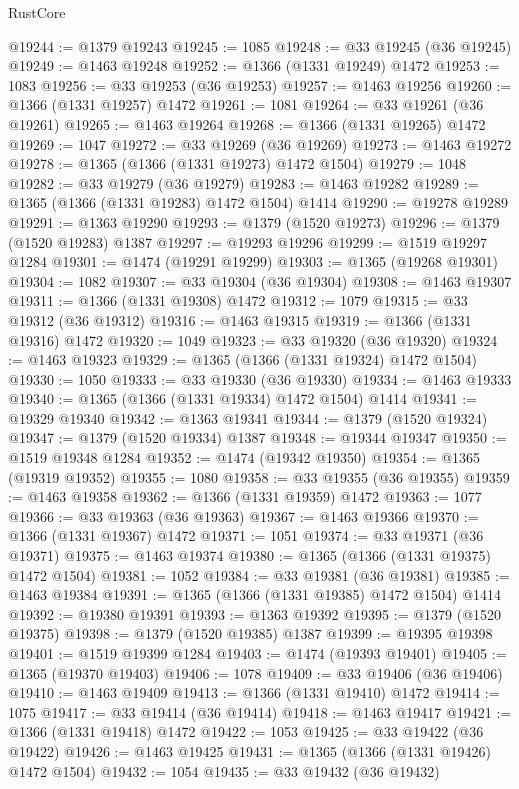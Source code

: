 \begin{lexlean}{RustCore}
\begin{coremodule}
@19244 := @1379 @19243
@19245 := 1085
@19248 := @33 @19245 (@36 @19245)
@19249 := @1463 @19248
@19252 := @1366 (@1331 @19249) @1472
@19253 := 1083
@19256 := @33 @19253 (@36 @19253)
@19257 := @1463 @19256
@19260 := @1366 (@1331 @19257) @1472
@19261 := 1081
@19264 := @33 @19261 (@36 @19261)
@19265 := @1463 @19264
@19268 := @1366 (@1331 @19265) @1472
@19269 := 1047
@19272 := @33 @19269 (@36 @19269)
@19273 := @1463 @19272
@19278 := @1365 (@1366 (@1331 @19273) @1472 @1504)
@19279 := 1048
@19282 := @33 @19279 (@36 @19279)
@19283 := @1463 @19282
@19289 := @1365 (@1366 (@1331 @19283) @1472 @1504) @1414
@19290 := @19278 @19289
@19291 := @1363 @19290
@19293 := @1379 (@1520 @19273)
@19296 := @1379 (@1520 @19283) @1387
@19297 := @19293 @19296
@19299 := @1519 @19297 @1284
@19301 := @1474 (@19291 @19299)
@19303 := @1365 (@19268 @19301)
@19304 := 1082
@19307 := @33 @19304 (@36 @19304)
@19308 := @1463 @19307
@19311 := @1366 (@1331 @19308) @1472
@19312 := 1079
@19315 := @33 @19312 (@36 @19312)
@19316 := @1463 @19315
@19319 := @1366 (@1331 @19316) @1472
@19320 := 1049
@19323 := @33 @19320 (@36 @19320)
@19324 := @1463 @19323
@19329 := @1365 (@1366 (@1331 @19324) @1472 @1504)
@19330 := 1050
@19333 := @33 @19330 (@36 @19330)
@19334 := @1463 @19333
@19340 := @1365 (@1366 (@1331 @19334) @1472 @1504) @1414
@19341 := @19329 @19340
@19342 := @1363 @19341
@19344 := @1379 (@1520 @19324)
@19347 := @1379 (@1520 @19334) @1387
@19348 := @19344 @19347
@19350 := @1519 @19348 @1284
@19352 := @1474 (@19342 @19350)
@19354 := @1365 (@19319 @19352)
@19355 := 1080
@19358 := @33 @19355 (@36 @19355)
@19359 := @1463 @19358
@19362 := @1366 (@1331 @19359) @1472
@19363 := 1077
@19366 := @33 @19363 (@36 @19363)
@19367 := @1463 @19366
@19370 := @1366 (@1331 @19367) @1472
@19371 := 1051
@19374 := @33 @19371 (@36 @19371)
@19375 := @1463 @19374
@19380 := @1365 (@1366 (@1331 @19375) @1472 @1504)
@19381 := 1052
@19384 := @33 @19381 (@36 @19381)
@19385 := @1463 @19384
@19391 := @1365 (@1366 (@1331 @19385) @1472 @1504) @1414
@19392 := @19380 @19391
@19393 := @1363 @19392
@19395 := @1379 (@1520 @19375)
@19398 := @1379 (@1520 @19385) @1387
@19399 := @19395 @19398
@19401 := @1519 @19399 @1284
@19403 := @1474 (@19393 @19401)
@19405 := @1365 (@19370 @19403)
@19406 := 1078
@19409 := @33 @19406 (@36 @19406)
@19410 := @1463 @19409
@19413 := @1366 (@1331 @19410) @1472
@19414 := 1075
@19417 := @33 @19414 (@36 @19414)
@19418 := @1463 @19417
@19421 := @1366 (@1331 @19418) @1472
@19422 := 1053
@19425 := @33 @19422 (@36 @19422)
@19426 := @1463 @19425
@19431 := @1365 (@1366 (@1331 @19426) @1472 @1504)
@19432 := 1054
@19435 := @33 @19432 (@36 @19432)

\end{coremodule}
\end{lexlean}
